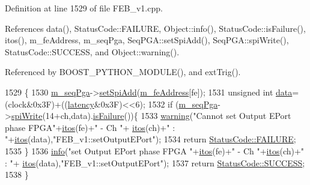 Definition at line 1529 of file F\+E\+B\+\_\+v1.\+cpp.



References data(), Status\+Code\+::\+F\+A\+I\+L\+U\+RE, Object\+::info(), Status\+Code\+::is\+Failure(), itos(), m\+\_\+fe\+Address, m\+\_\+seq\+Pga, Seq\+P\+G\+A\+::set\+Spi\+Add(), Seq\+P\+G\+A\+::spi\+Write(), Status\+Code\+::\+S\+U\+C\+C\+E\+SS, and Object\+::warning().



Referenced by B\+O\+O\+S\+T\+\_\+\+P\+Y\+T\+H\+O\+N\+\_\+\+M\+O\+D\+U\+L\+E(), and ext\+Trig().


\begin{DoxyCode}
1529                                                                        \{
1530   \hyperlink{classFEB__v1_a6c7804ac86796f233a8393043adf2e77}{m\_seqPga}->\hyperlink{classSeqPGA_ac998ce3a6d9b5f2e88cc8393f8c1df53}{setSpiAdd}(\hyperlink{classFEB__v1_a4e1945c2d5b434125f375e9d0fc6d99f}{m\_feAddress}[fe]);
1531   \textcolor{keywordtype}{unsigned} \textcolor{keywordtype}{int} \hyperlink{classFEB__v1_a6bca4320bd3bbbc32efc81097f33421a}{data}=(clock&0x3F)+((\hyperlink{classFEB__v1_a68050d232efd8d6568910b09a2c18f62}{latency}&0x3F)<<6);
1532   \textcolor{keywordflow}{if} (\hyperlink{classFEB__v1_a6c7804ac86796f233a8393043adf2e77}{m\_seqPga}->\hyperlink{classSeqPGA_ad4421841ce4ce8b88ad13f63216f0743}{spiWrite}(14+ch,data).\hyperlink{classStatusCode_a5dd22dc6eb2c52fc4cabc58f6dea2eb7}{isFailure}())\{
1533     \hyperlink{classObject_a65cd4fda577711660821fd2cd5a3b4c9}{warning}(\textcolor{stringliteral}{"Cannot set Output EPort phase FPGA"}+\hyperlink{Tools_8h_af330027dbdafb9a30768b3613c553e60}{itos}(fe)+\textcolor{stringliteral}{" - Ch "}+
      \hyperlink{Tools_8h_af330027dbdafb9a30768b3613c553e60}{itos}(ch)+\textcolor{stringliteral}{" : "}+\hyperlink{Tools_8h_af330027dbdafb9a30768b3613c553e60}{itos}(data),\textcolor{stringliteral}{"FEB\_v1::setOutputEPort"});
1534     \textcolor{keywordflow}{return} \hyperlink{classStatusCode_a6f565cbeadc76d14c72f047e5e85eb4ba3da73d4c469762eb9d3c960368252b26}{StatusCode::FAILURE};
1535   \}
1536   \hyperlink{classObject_a644fd329ea4cb85f54fa6846484b84a8}{info}(\textcolor{stringliteral}{"set Output EPort phase FPGA "}+\hyperlink{Tools_8h_af330027dbdafb9a30768b3613c553e60}{itos}(fe)+\textcolor{stringliteral}{" - Ch "}+\hyperlink{Tools_8h_af330027dbdafb9a30768b3613c553e60}{itos}(ch)+\textcolor{stringliteral}{" : "}+
      \hyperlink{Tools_8h_af330027dbdafb9a30768b3613c553e60}{itos}(data),\textcolor{stringliteral}{"FEB\_v1::setOutputEPort"});
1537   \textcolor{keywordflow}{return} \hyperlink{classStatusCode_a6f565cbeadc76d14c72f047e5e85eb4badd0da38d3ba0d922efd1f4619bc37ad8}{StatusCode::SUCCESS};
1538 \}
\end{DoxyCode}
\mbox{\label{classHierarchy_a585ad1aeec16077a0e532ab8b4fc557b}} 
